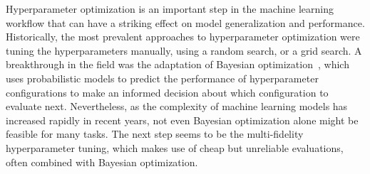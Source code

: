 


%


Hyperparameter optimization is an important step in the machine learning workflow that can have a striking effect on model generalization and performance. Historically, the most prevalent approaches to hyperparameter optimization were tuning the hyperparameters manually, using a random search, or a grid search. A breakthrough in the field was the adaptation of Bayesian optimization~\cite{mockus1974bayesian,snoek2012practical}, which uses probabilistic models to predict the performance of hyperparameter configurations to make an informed decision about which configuration to evaluate next. Nevertheless, as the complexity of machine learning models has increased rapidly in recent years, not even Bayesian optimization alone might be feasible for many tasks. The next step seems to be the multi-fidelity hyperparameter tuning, which makes use of cheap but unreliable evaluations, often combined with Bayesian optimization.

